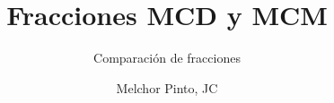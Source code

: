 \documentclass{guia}
\title{Fracciones MCD y MCM}
\subtitle{Comparación de fracciones}
\author{Melchor Pinto, JC}
\begin{document}
%
\begin{questions}
\questionboxed{}
\end{questions}
\end{document}
